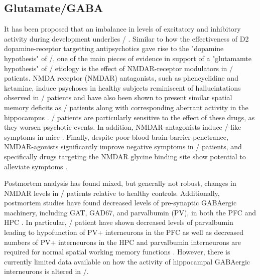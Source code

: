 




\subsection{Glutamate/GABA}\label{sec:intro:scz:glutamate}
It has been proposed that an imbalance in levels of excitatory and inhibitory activity during development underlies \scz/ \citep{Insel2010, Coyle2006, Yizhar2011}.
Similar to how the effectiveness of D2 dopamine-receptor targetting antipsychotics gave rise to the "dopamine hypothesis" of \scz/, one of the main pieces of evidence in support of a "glutamamte hypothesis" of \scz/ etiology is the effect of NMDAR-receptor modulators in \scz/ patients.
NMDA receptor (NMDAR) antagonists, such as phencyclidine and ketamine, induce psychoses in healthy subjects reminiscent of hallucintations observed in \scz/ patients \citep{Javitt1991, Krystal1994} and have also been shown to present similar spatial memory deficits as \scz/ patients along with corresponding aberrant activity in the hippocampus \citep{Morgan2014}.
\Scz/ patients are particularly sensitive to the effect of these drugs, as they worsen psychotic events.
In addition, NMDAR-antagonists induce \scz/-like symptoms in mice \citep{Inta2010}.
Finally, despite poor blood-brain barrier penetrance, NMDAR-agonists significantly improve negative symptoms in \scz/ patients, and specifically drugs targeting the NMDAR glycine binding site show potential to alleviate symptoms \citep{Tsai1998, Coyle2012}.


Postmortem analysis has found mixed, but generally not robust, changes in NMDAR levels in \scz/ patients relative to healthy controls.
Additionally, postmortem studies have found decreased levels of pre-synaptic GABAergic machinery, including GAT, GAD67, and parvalbumin (PV), in both the \ac{PFC} and HPC \citep{Coyle2006, Zhang2002, Konradi2011}.
In particular, \scz/ patient have shown decreased levels of parvalbumin leading to hypofunction of PV+ interneurons in the \ac{PFC} as well as decreased numbers of PV+ interneurons in the HPC \citep{Zhang2002, Lewis2005} and parvalbumin interneurons are required for normal spatial working memory functions \citep{Korotkova2010, Murray2011}.
However, there is currently limited data available on how the activity of hippocampal GABAergic interneurons is altered in \scz/.
